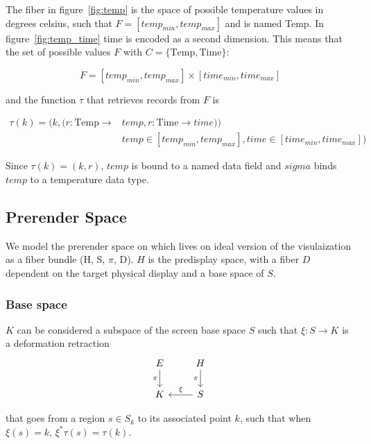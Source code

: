 \documentclass[../main.tex]{subfiles}
\begin{document}
The fiber in figure~\ref{fig:temp} is the space of possible temperature values in degrees celsius, such that $F=[temp_{min}, temp_{max}]$ and is named \textrm{Temp}. In figure~\ref{fig:temp_time} \textrm{time} is encoded as a second dimension. This means that the set of possible values $F$ with $C=\{\textrm{Temp}, \textrm{Time}\}$:

\begin{equation}
F = [temp_{min}, temp_{max}] \times [time_{min}, time_{max}]
\end{equation}

and the function $\tau$ that retrieves records from $F$ is

\begin{align}
\tau(k) =(k, (r: \textrm{Temp}\rightarrow &temp, r: \textrm{Time}\rightarrow time))\\
&temp \in [temp_{min}, temp_{max}], time \in [time_{min}, time_{max}])
\end{align}

Since $\tau(k)=(k, r)$, $temp$ is bound to a named data field and $sigma$ binds $temp$ to a temperature data type. 

\subsection{Prerender Space}
\label{sec:display}
We model the prerender space on which lives on ideal version of the visulaization as a fiber bundle (H, S, $\pi$, D). $H$ is the predisplay space, with a fiber $D$ dependent on the target physical display and a base space of $S$. 

\subsubsection{Base space}
$K$ can be considered a subspace of the screen base space $S$ such that $\xi: S \rightarrow K$ is a deformation retraction \cite{RetractionTopology2020}
\begin{equation}
    \begin{tikzcd}
        E \arrow[d, "\pi"'] & H \arrow[d, "\pi"'] \\
        K                   & S \arrow[l, "\xi"']
        \end{tikzcd}
\end{equation}

that goes from a region $s \in S_{k}$ to its associated point $k$, such that when $\xi(s) = k$, $\xi^*\tau(s) = \tau(k)$. 
\end{document}

